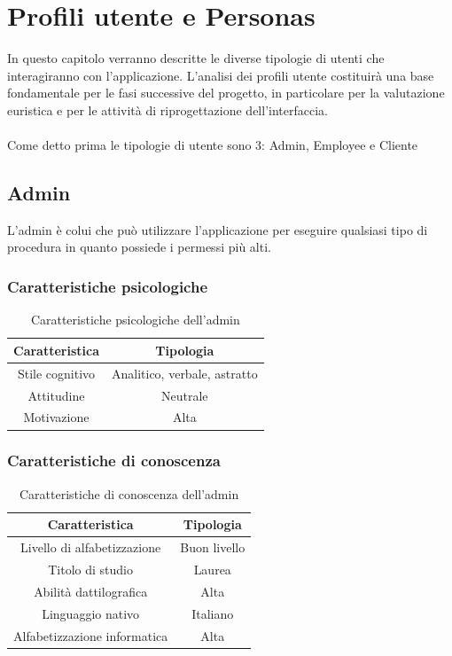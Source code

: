 \section{Profili utente e Personas}
In questo capitolo verranno descritte le diverse tipologie di utenti che interagiranno con l’applicazione. L’analisi dei profili utente costituirà una base fondamentale per le fasi successive del progetto, in particolare per la valutazione euristica e per le attività di riprogettazione dell’interfaccia.
\\
\\
Come detto prima le tipologie di utente sono 3: Admin, Employee e Cliente

\subsection{Admin}
L'admin è colui che può utilizzare l'applicazione per eseguire qualsiasi tipo di procedura in quanto possiede i permessi più alti. 

\subsubsection{Caratteristiche psicologiche}
\begin{table}[h]
	\centering
	\begin{tabular}{|c|c|}
		\hline
		\textbf{Caratteristica} & \textbf{Tipologia} \\
		\hline
		Stile cognitivo & Analitico, verbale, astratto\\
		\hline
		Attitudine & Neutrale \\
		\hline
		Motivazione & Alta \\
		\hline
	\end{tabular}
	\caption{Caratteristiche psicologiche dell'admin}
\end{table}

\subsubsection{Caratteristiche di conoscenza}
\begin{table}[h]
	\centering
	\begin{tabular}{|c|c|}
		\hline
		\textbf{Caratteristica} & \textbf{Tipologia} \\
		\hline
		Livello di alfabetizzazione & Buon livello \\
		\hline
		Titolo di studio & Laurea \\
		\hline
		Abilità dattilografica & Alta \\
		\hline
		Linguaggio nativo & Italiano \\
		\hline
		Alfabetizzazione informatica & Alta \\
		\hline
	\end{tabular}
	\caption{Caratteristiche di conoscenza dell'admin}
\end{table}

